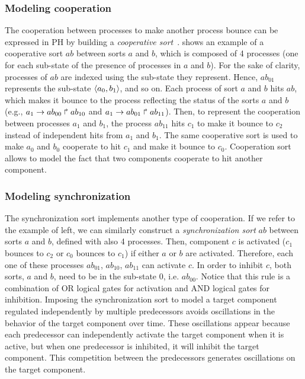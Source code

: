 \subsubsection{Modeling cooperation}

The cooperation between processes to make another process bounce can be
expressed in PH by building a \emph{cooperative sort}~\cite{PMR10-TCSB}.
 shows an example of a cooperative sort $ab$ between sorts $a$ and $b$,
which is composed of 4 processes (one for each sub-state of the presence of processes in $a$ and $b$).
For the sake of clarity, processes of $ab$ are indexed using the sub-state they represent.
Hence, $ab_{01}$ represents the sub-state $\langle a_0,b_1 \rangle$, and so on.
Each process of sort $a$ and $b$ hits $ab$, which makes it bounce to the process reflecting the status of the sorts $a$
and $b$ (e.g., $a_1\rightarrow ab_{00}\Rsh ab_{10}$ and $a_1\rightarrow ab_{01}\Rsh ab_{11}$).
Then, to represent the cooperation between processes $a_1$ and $b_1$,
the process $ab_{11}$ hits $c_1$ to make it bounce to $c_2$ instead of
independent hits from $a_1$ and $b_1$.
The same cooperative sort is used to make $a_0$ and $b_0$ cooperate to hit $c_1$ and make it bounce to $c_0$.
Cooperation sort allows to model the fact that two components cooperate to hit another component.
\subsubsection{Modeling synchronization}
\label{sssec:synchronization}

The synchronization sort implements another type of cooperation. If we refer to the example of
 left, we can similarly construct a \emph{synchronization sort} $ab$ between sorts $a$ and $b$, defined with also 
4 processes. Then, component $c$ is activated ($c_1$ bounces to $c_2$ or $c_0$ bounces to $c_1$) if either  $a$ or $b$ are activated. Therefore, each one of 
these processes $ab_{01}$, $ab_{10}$, $ab_{11}$ can activate $c$.  In order to inhibit $c$, both sorts, $a$ and $b$, need to be 
in the sub-state $0$, i.e. $ab_{00}$. Notice that this rule is a combination of OR logical gates for activation and AND logical gates for inhibition.
Imposing the synchronization sort to model a target component regulated independently by multiple predecessors avoids oscillations in the behavior of the target component over time. 
These oscillations appear because each predecessor can independently activate the target component when it is active,
but when one predecessor is inhibited, it will inhibit the target component. This competition between the predecessors
generates oscillations on the target component.  


